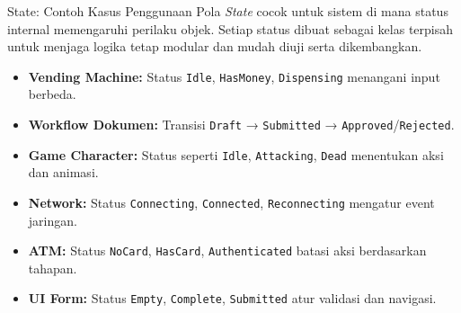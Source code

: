 \documentclass[aspectratio=169, table]{beamer}
\begin{document}
\begin{frame}{State: Contoh Kasus Penggunaan}
	\vspace{6pt}
	Pola \textit{State} cocok untuk sistem di mana status internal memengaruhi perilaku objek. Setiap status dibuat sebagai kelas terpisah untuk menjaga logika tetap modular dan mudah diuji serta dikembangkan.
	
	\vspace{6pt}
	\begin{itemize}
		\item \textbf{Vending Machine:} Status \texttt{Idle}, \texttt{HasMoney}, \texttt{Dispensing} menangani input berbeda.
		\item \textbf{Workflow Dokumen:} Transisi \texttt{Draft} → \texttt{Submitted} → \texttt{Approved}/\texttt{Rejected}.
		\item \textbf{Game Character:} Status seperti \texttt{Idle}, \texttt{Attacking}, \texttt{Dead} menentukan aksi dan animasi.
		\item \textbf{Network:} Status \texttt{Connecting}, \texttt{Connected}, \texttt{Reconnecting} mengatur event jaringan.
		\item \textbf{ATM:} Status \texttt{NoCard}, \texttt{HasCard}, \texttt{Authenticated} batasi aksi berdasarkan tahapan.
		\item \textbf{UI Form:} Status \texttt{Empty}, \texttt{Complete}, \texttt{Submitted} atur validasi dan navigasi.
	\end{itemize}
\end{frame}
\end{document}
